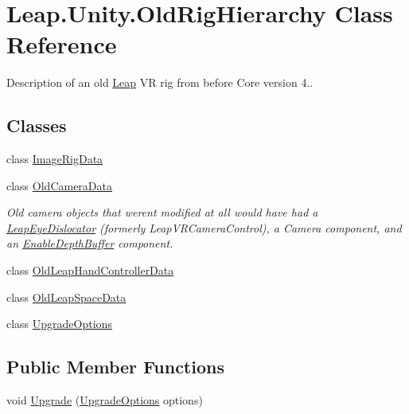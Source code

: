 \hypertarget{class_leap_1_1_unity_1_1_old_rig_hierarchy}{}\section{Leap.\+Unity.\+Old\+Rig\+Hierarchy Class Reference}
\label{class_leap_1_1_unity_1_1_old_rig_hierarchy}


Description of an old \mbox{\hyperlink{namespace_leap_1_1_unity_1_1_leap}{Leap}} VR rig from before Core version 4..  


\subsection*{Classes}
\begin{DoxyCompactItemize}
\item 
class \mbox{\hyperlink{class_leap_1_1_unity_1_1_old_rig_hierarchy_1_1_image_rig_data}{Image\+Rig\+Data}}
\item 
class \mbox{\hyperlink{class_leap_1_1_unity_1_1_old_rig_hierarchy_1_1_old_camera_data}{Old\+Camera\+Data}}
\begin{DoxyCompactList}\small\item\em Old camera objects that weren\textquotesingle{}t modified at all would have had a \mbox{\hyperlink{class_leap_1_1_unity_1_1_leap_eye_dislocator}{Leap\+Eye\+Dislocator}} (formerly Leap\+V\+R\+Camera\+Control), a Camera component, and an \mbox{\hyperlink{class_leap_1_1_unity_1_1_enable_depth_buffer}{Enable\+Depth\+Buffer}} component. \end{DoxyCompactList}\item 
class \mbox{\hyperlink{class_leap_1_1_unity_1_1_old_rig_hierarchy_1_1_old_leap_hand_controller_data}{Old\+Leap\+Hand\+Controller\+Data}}
\item 
class \mbox{\hyperlink{class_leap_1_1_unity_1_1_old_rig_hierarchy_1_1_old_leap_space_data}{Old\+Leap\+Space\+Data}}
\item 
class \mbox{\hyperlink{class_leap_1_1_unity_1_1_old_rig_hierarchy_1_1_upgrade_options}{Upgrade\+Options}}
\end{DoxyCompactItemize}
\subsection*{Public Member Functions}
\begin{DoxyCompactItemize}
\item 
void \mbox{\hyperlink{class_leap_1_1_unity_1_1_old_rig_hierarchy_a3b5f9882e0f1fe11166886bdbf0f4029}{Upgrade}} (\mbox{\hyperlink{class_leap_1_1_unity_1_1_old_rig_hierarchy_1_1_upgrade_options}{Upgrade\+Options}} options)
\end{DoxyCompactItemize}

